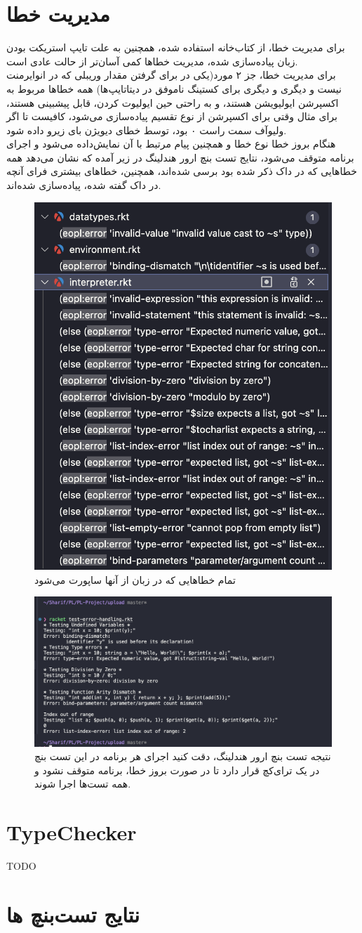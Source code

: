 \documentclass{article}
\begin{document}
\section{مدیریت خطا}
برای مدیریت خطا، از کتاب‌خانه 
استفاده شده، همچنین به علت تایپ استریکت بودن زبان پیاده‌سازی شده، مدیریت‌ خطا‌ها کمی آسان‌تر از حالت عادی‌ است.
\\
برای مدیریت خطا، جز ۲ مورد(یکی در برای گرفتن مقدار وریبلی که در انوایرمنت نیست و دیگری و دیگری برای کستینگ ناموفق در دیتاتایپ‌ها)
همه خطا‌ها مربوط به اکسپرشن ایولیویشن هستند، و به راحتی حین ایولیوت کردن، قابل پیشبینی هستند، برای مثال وقتی 
برای اکسپرشن از نوع تقسیم پیاده‌سازی می‌شود، کافیست تا اگر ولیو‌آف سمت راست ۰ بود، توسط 
خطای دیویژن بای زیرو داده شود.
\\
هنگام بروز خطا نوع خطا و همچنین پیام مرتبط با آن نمایش‌داده می‌شود و اجرای برنامه متوقف می‌شود، نتایج تست بنچ ارور هندلینگ در زیر آمده که نشان می‌دهد 
همه خطا‌هایی که در داک ذکر شده بود برسی شده‌اند، همچنین، خطا‌های بیشتری فرای آنچه در داک گفته شده، پیاده‌سازی شده‌اند.
\\
\begin{figure}[h]
        \centering
        \includegraphics[width=0.5\linewidth]{pics/eopl.png}
        \caption{تمام‌ خطا‌هایی که در زبان از آنها ساپورت می‌شود}
\end{figure}

\begin{figure}[h]
           \centering
        \includegraphics[width=1\linewidth]{pics/error-tb.png}
        \caption{نتیجه تست بنچ ارور هندلینگ، دقت کنید اجرای هر برنامه در این تست بنچ در یک ترای‌کچ قرار دارد تا در صورت بروز خطا، برنامه متوقف نشود و همه تست‌ها اجرا شوند.}     
\end{figure}
\FloatBarrier
\section{TypeChecker}
TODO
\section{نتایج تست‌بنچ ها}
\end{document}

